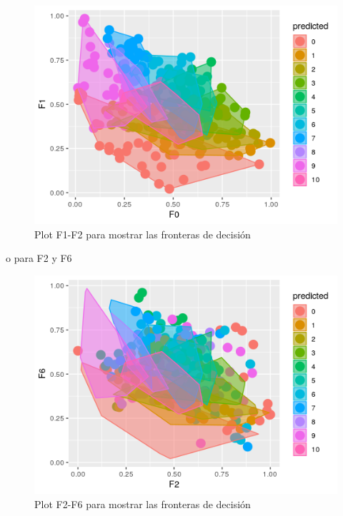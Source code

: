 \begin{figure}[H] %
	\centering
	\includegraphics[scale=0.8]{boundaries-knn.png}  %
	\caption{Plot F1-F2 para mostrar las fronteras de decisión} 
	\label{fig:boundaries-knn}
\end{figure}

o para F2 y F6

\begin{figure}[H] %
	\centering
	\includegraphics[scale=0.8]{boundariesf2f6-knn.png}  %
	\caption{Plot F2-F6 para mostrar las fronteras de decisión} 
	\label{fig:boundaries-knn-f2f6}
\end{figure}

